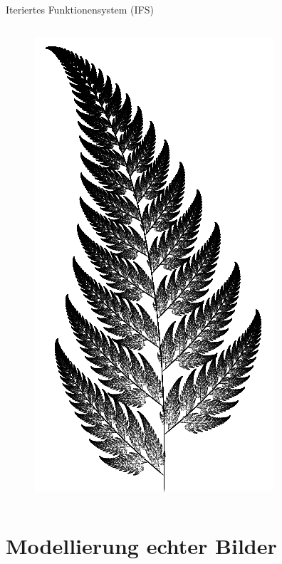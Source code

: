 \documentclass[10pt]{beamer}
\begin{document}
\begin{frame}{Iteriertes Funktionensystem (IFS)}
\begin{columns}[T,onlytextwidth]
      \begin{figure}
        \includegraphics[width=.8\textwidth]{fern}
      \end{figure}
  \end{columns}
\end{frame}

\section{Modellierung echter Bilder}
\end{document}
